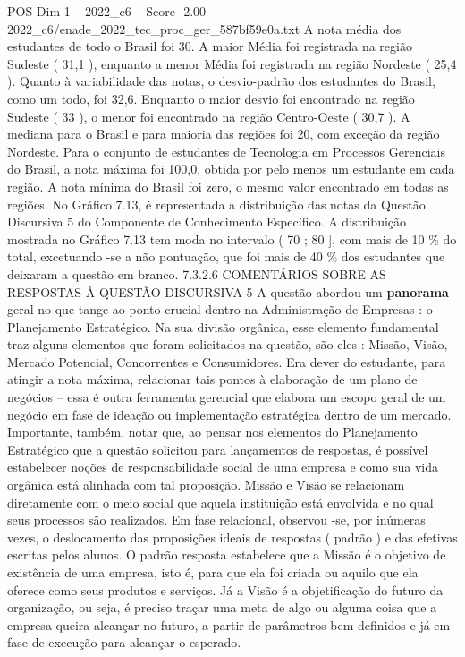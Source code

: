 \begin{textsample}{POS Dim 1 – 2022\_c6 – Score -2.00 – 2022\_c6/enade\_2022\_tec\_proc\_ger\_587bf59e0a.txt}
A nota média dos estudantes de todo o Brasil foi 30.
A maior Média foi registrada na região Sudeste ( 31,1 ), enquanto a menor Média foi registrada na região Nordeste ( 25,4 ).
Quanto à variabilidade das notas, o desvio-padrão dos estudantes do Brasil, como um todo, foi 32,6.
Enquanto o maior desvio foi encontrado na região Sudeste ( 33 ), o menor foi encontrado na região Centro-Oeste ( 30,7 ).
A mediana para o Brasil e para maioria das regiões foi 20, com exceção da região Nordeste.
Para o conjunto de estudantes de Tecnologia em Processos Gerenciais do Brasil, a nota máxima foi 100,0, obtida por pelo menos um estudante em cada região.
A nota mínima do Brasil foi zero, o mesmo valor encontrado em todas as regiões.
No Gráfico 7.13, é representada a distribuição das notas da Questão Discursiva 5 do Componente de Conhecimento Específico.
A distribuição mostrada no Gráfico 7.13 tem moda no intervalo ( 70 ; 80 ], com mais de 10 \% do total, excetuando -se a não pontuação, que foi mais de 40 \% dos estudantes que deixaram a questão em branco. 7.3.2.6 COMENTÁRIOS SOBRE AS RESPOSTAS À QUESTÃO DISCURSIVA 5 A questão abordou um \textbf{panorama} geral no que tange ao ponto crucial dentro na Administração de Empresas : o Planejamento Estratégico.
Na sua divisão orgânica, esse elemento fundamental traz alguns elementos que foram solicitados na questão, são eles : Missão, Visão, Mercado Potencial, Concorrentes e Consumidores.
Era dever do estudante, para atingir a nota máxima, relacionar tais pontos à elaboração de um plano de negócios – essa é outra ferramenta gerencial que elabora um escopo geral de um negócio em fase de ideação ou implementação estratégica dentro de um mercado.
Importante, também, notar que, ao pensar nos elementos do Planejamento Estratégico que a questão solicitou para lançamentos de respostas, é possível estabelecer noções de responsabilidade social de uma empresa e como sua vida orgânica está alinhada com tal proposição.
Missão e Visão se relacionam diretamente com o meio social que aquela instituição está envolvida e no qual seus processos são realizados.
Em fase relacional, observou -se, por inúmeras vezes, o deslocamento das proposições ideais de respostas ( padrão ) e das efetivas escritas pelos alunos.
O padrão resposta estabelece que a Missão é o objetivo de existência de uma empresa, isto é, para que ela foi criada ou aquilo que ela oferece como seus produtos e serviços.
Já a Visão é a objetificação do futuro da organização, ou seja, é preciso traçar uma meta de algo ou alguma coisa que a empresa queira alcançar no futuro, a partir de parâmetros bem definidos e já em fase de execução para alcançar o esperado.

\end{textsample}
